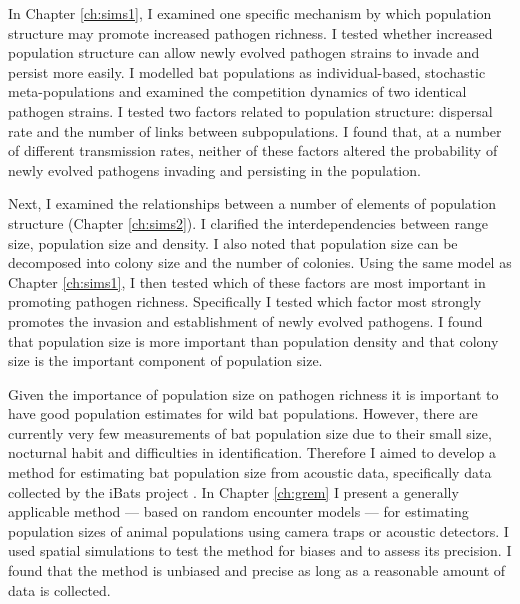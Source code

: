 In Chapter \ref{ch:sims1}, I examined one specific mechanism by which population structure may promote increased pathogen richness.
I tested whether increased population structure can allow newly evolved pathogen strains to invade and persist more easily.
I modelled bat populations as individual-based, stochastic meta-populations and examined the competition dynamics of two identical pathogen strains.
I tested two factors related to population structure: dispersal rate and the number of links between subpopulations.
I found that, at a number of different transmission rates, neither of these factors altered the probability of newly evolved pathogens invading and persisting in the population.


Next, I examined the relationships between a number of elements of population structure (Chapter \ref{ch:sims2}).
I clarified the interdependencies between range size, population size and density.
I also noted that population size can be decomposed into colony size and the number of colonies.
Using the same model as Chapter \ref{ch:sims1}, I then tested which of these factors are most important in promoting pathogen richness.
Specifically I tested which factor most strongly promotes the invasion and establishment of newly evolved pathogens.
I found that population size is more important than population density and that colony size is the important component of population size.


Given the importance of population size on pathogen richness it is important to have good population estimates for wild bat populations.
However, there are currently very few measurements of bat population size due to their small size, nocturnal habit and difficulties in identification.
Therefore I aimed to develop a method for estimating bat population size from acoustic data, specifically data collected by the iBats project \cite{jones2011indicator}.
In Chapter \ref{ch:grem} I present a generally applicable method --- based on random encounter models \cite{rowcliffe2008estimating, yapp1956theory} --- for estimating population sizes of animal populations using camera traps or acoustic detectors.
I used spatial simulations to test the method for biases and to assess its precision.
I found that the method is unbiased and precise as long as a reasonable amount of data is collected.














